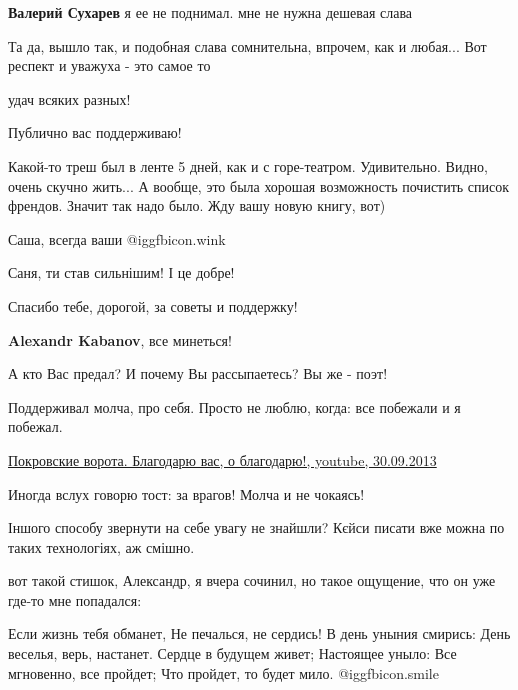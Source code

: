 \begin{itemize}
\begin{itemize}
\textbf{Валерий Сухарев} я ее не поднимал. мне не нужна дешевая слава


Та да, вышло так, и подобная слава сомнительна, впрочем, как и любая... Вот
респект и уважуха - это самое то

\end{itemize} %

удач всяких разных!

Публично вас поддерживаю!


Какой-то треш был в ленте 5 дней, как и с горе-театром. Удивительно. Видно, очень скучно жить...
А вообще, это была хорошая возможность почистить список френдов. Значит так надо было.
Жду вашу новую книгу, вот)

Саша, всегда ваши  @igg{fbicon.wink} 


Саня, ти став сильнішим! І це добре!

\begin{itemize} %
Спасибо тебе, дорогой, за советы и поддержку!


\textbf{Alexandr Kabanov}, все минеться!

А кто Вас предал? И почему Вы рассыпаетесь? Вы же - поэт!
\end{itemize} %

Поддерживал молча, про себя. Просто не люблю, когда: все побежали и я побежал.


\href{https://youtu.be/3Sp5tHHre6A}{%
Покровские ворота. Благодарю вас, о благодарю!, youtube, 30.09.2013%
}

Иногда вслух говорю тост: за врагов! Молча и не чокаясь!

Іншого способу звернути на себе увагу не знайшли? Кєйси писати вже можна по таких технологіях, аж смішно.


вот такой стишок, Александр, я вчера сочинил, но такое ощущение, что он уже
где-то мне попадался:

\obeycr
Если жизнь тебя обманет,
Не печалься, не сердись!
В день уныния смирись:
День веселья, верь, настанет.
Сердце в будущем живет;
Настоящее уныло:
Все мгновенно, все пройдет;
Что пройдет, то будет мило.
\restorecr
 @igg{fbicon.smile} 


\end{itemize}
